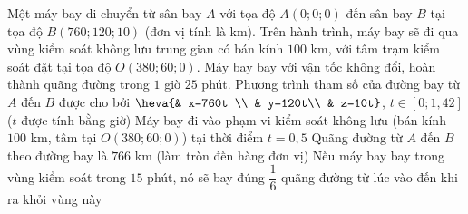 \begin{ex}%
Một máy bay di chuyển từ sân bay $A$ với tọa độ $A(0;0;0)$ đến sân bay $B$ tại tọa độ $B(760;120;10)$ (đơn vị tính là km). Trên hành trình, máy bay sẽ đi qua vùng kiểm soát không lưu trung gian có bán kính $100$ km, với tâm trạm kiểm soát đặt tại tọa độ $O(380;60;0)$. Máy bay bay với vận tốc không đổi, hoàn thành quãng đường trong $1$ giờ $25$ phút.
\choiceTF
{\True Phương trình tham số của đường bay từ $A$ đến $B$ được cho bởi $\heva{& x=760t \\ & y=120t\\ & z=10t}$, $t\in[0;1{,}42]$ ($t$ được tính bằng giờ)}
{\True Máy bay đi vào phạm vi kiểm soát không lưu (bán kính $100$ km, tâm tại $O(380;60;0)$) tại thời điểm $t=0{,}5$}
{Quãng đường từ $A$ đến $B$ theo đường bay là $766$ km (làm tròn đến hàng đơn vị)}
{Nếu máy bay bay trong vùng kiểm soát trong $15$ phút, nó sẽ bay đúng $\dfrac{1}{6}$ quãng đường từ lúc vào đến khi ra khỏi vùng này}
\end{ex}


